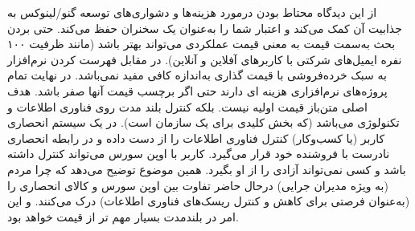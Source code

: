 
از این دیدگاه محتاط بودن درمورد هزینه‌ها و دشواری‌های توسعه گنو/لینوکس
به جذابیت آن کمک می‌کند و اعتبار شما را به‌عنوان یک سخنران حفظ می‌کند.
حتی بردن بحث به‌سمت قیمت به معنی قیمت عملکردی می‌تواند بهتر باشد
(مانند ظرفیت ۱۰۰ نفره ایمیل‌های شرکتی با کاربر‌های آفلاین و آنلاین).
در مقابل فهرست کردن نرم‌افزار به سبک خرده‌فروشی با قیمت گذاری به‌اندازه کافی مفید نمی‌باشد.
در نهایت تمام پروژه‌های نرم‌افزاری هزینه ای دارند حتی اگر برچسب قیمت آنها صفر باشد.
هدف اصلی متن‌باز قیمت اولیه نیست. بلکه کنترل بلند مدت روی فناوری اطلاعات و تکنولوژی می‌باشد
(که بخش کلیدی برای یک سازمان است). در یک سیستم انحصاری کاربر (یا کسب‌و‌کار) کنترل فناوری اطلاعات
را از دست داده و در رابطه انحصاری نادرست با فروشنده خود قرار می‌گیرد.
کاربر با اوپن سورس می‌تواند کنترل داشته باشد و کسی نمی‌تواند آزادی را از او بگیرد.
همین موضوع توضیح می‌دهد که چرا مردم (به ویژه مدیران جرایی) درحال حاضر تفاوت بین 
اوپن سورس و کالای انحصاری را (به‌عنوان فرصتی برای کاهش و کنترل ریسک‌های فناوری اطلاعات)
درک می‌کنند. و این امر در بلندمدت بسیار مهم تر از قیمت خواهد بود.

